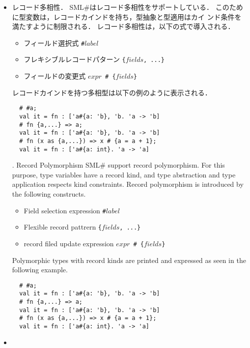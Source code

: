 \documentclass{jbook}
\newcommand{\smlsharp}{SML\#}
\begin{document}
\begin{itemize}
\item 
\ifjp%
	レコード多相性．
	\smlsharp{}はレコード多相性をサポートしている．
	このために型変数は，レコードカインドを持ち，型抽象と型適用はカイ
ンド条件を満たすように制限される．
	レコード多相性は，以下の式で導入される．
\begin{itemize}
\item フィールド選択式 {\tt \#$label$}
\item フレキシブルレコードパターン {\tt \{$fields$, ...\}}
\item フィールドの変更式 {\tt $expr$ \# \{$fields$\}}
\end{itemize}
	レコードカインドを持つ多相型は以下の例のように表示される．
\begin{verbatim}
  # #a;
  val it = fn : ['a#{a: 'b}, 'b. 'a -> 'b]
  # fn {a,...} => a;
  val it = fn : ['a#{a: 'b}, 'b. 'a -> 'b]
  # fn (x as {a,...}) => x # {a = a + 1};
  val it = fn : ['a#{a: int}. 'a -> 'a]
\end{verbatim}
\else%
.	Record Polymorphism
	\smlsharp{} support record polymorphism.
	For this purpose, type variables have a record kind, and type
abstraction and type application respects kind constraints.
	Record polymorphism is introduced by the following constructs.
\begin{itemize}
\item Field selection expression {\tt \#$label$}
\item Flexible record pattrern {\tt \{$fields$, ...\}}
\item record filed update expression {\tt $expr$ \# \{$fields$\}}
\end{itemize}
	Polymorphic types with record kinds are printed and expressed as
seen in the following example.
\begin{verbatim}
  # #a;
  val it = fn : ['a#{a: 'b}, 'b. 'a -> 'b]
  # fn {a,...} => a;
  val it = fn : ['a#{a: 'b}, 'b. 'a -> 'b]
  # fn (x as {a,...}) => x # {a = a + 1};
  val it = fn : ['a#{a: int}. 'a -> 'a]
\end{verbatim}
\fi%

\item 


\end{itemize}
\end{document}

